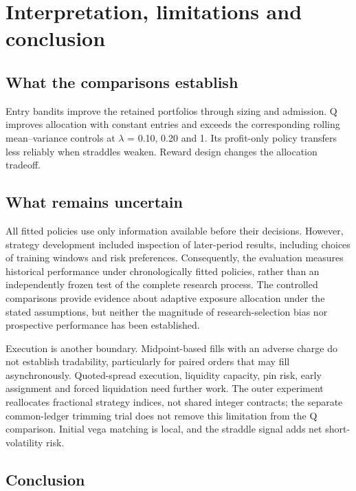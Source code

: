 \section{Interpretation, limitations and conclusion}\label{sec:20}

\subsection*{What the comparisons establish}

Entry bandits improve the retained portfolios through sizing and admission. Q improves allocation with constant entries and exceeds the corresponding rolling mean--variance controls at \(\lambda\) = 0.10, 0.20 and 1. Its profit-only policy transfers less reliably when straddles weaken. Reward design changes the allocation tradeoff.


\subsection*{What remains uncertain}

All fitted policies use only information available before their decisions. However, strategy development included inspection of later-period results, including choices of training windows and risk preferences. Consequently, the evaluation measures historical performance under chronologically fitted policies, rather than an independently frozen test of the complete research process. The controlled comparisons provide evidence about adaptive exposure allocation under the stated assumptions, but neither the magnitude of research-selection bias nor prospective performance has been established.


Execution is another boundary. Midpoint-based fills with an adverse charge do not establish tradability, particularly for paired orders that may fill asynchronously. Quoted-spread execution, liquidity capacity, pin risk, early assignment and forced liquidation need further work. The outer experiment reallocates fractional strategy indices, not shared integer contracts; the separate common-ledger trimming trial does not remove this limitation from the Q comparison. Initial vega matching is local, and the straddle signal adds net short-volatility risk.



\subsection*{Conclusion}

